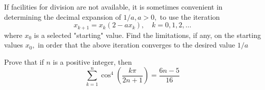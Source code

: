 \documentclass{pset}
\begin{document}
\begin{problems}
\begin{problem}[IrMO 1988 Q11]
    If facilities for division are not available, it is sometimes convenient in determining the decimal expansion of \(1 / a, a>0,\) to use the iteration
    $$
    x_{k+1}=x_{k}\left(2-a x_{k}\right), \quad k=0,1,2, \ldots
    $$
    where \(x_{0}\) is a selected "starting" value. Find the limitations, if any, on the starting values \(x_{0},\) in order that the above iteration converges to the desired value \(1 / a\)
\end{problem}

\begin{problem}[IrMO 1988 Q12]
    Prove that if \(n\) is a positive integer, then
    $$
    \sum_{k=1}^{n} \cos ^{4}\left(\frac{k \pi}{2 n+1}\right)=\frac{6 n-5}{16}
    $$
\end{problem}






















































































































\end{problems}
\end{document}
